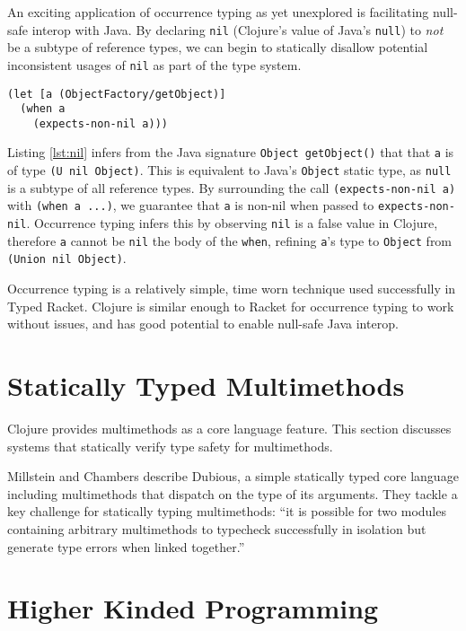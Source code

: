 An exciting application of occurrence typing as yet unexplored is facilitating null-safe interop with Java.
By declaring \lstinline|nil| (Clojure's value of Java's \lstinline|null|) to \emph{not} be a subtype of reference types,
we can begin to statically disallow potential inconsistent usages of \lstinline|nil| as part of the type system.

\begin{lstlisting}[caption=Observing nil-checks using occurrence typing, label=lst:nil]
(let [a (ObjectFactory/getObject)]
  (when a
    (expects-non-nil a)))
\end{lstlisting}

Listing \ref{lst:nil} infers from the Java signature \lstinline|Object getObject()| that
that \lstinline|a| is of type \lstinline|(U nil Object)|. This is equivalent to Java's
\lstinline|Object| static type, as \lstinline|null| is a subtype of all reference types. By surrounding
the call \lstinline|(expects-non-nil a)| with \lstinline|(when a ...)|, we guarantee that
\lstinline|a| is non-nil when passed to \lstinline|expects-non-nil|. Occurrence typing infers
this by observing \lstinline|nil| is a false value in Clojure, therefore \lstinline|a| cannot
be \lstinline|nil| the body of the \lstinline|when|, refining \lstinline|a|'s type to \lstinline|Object|
from \lstinline|(Union nil Object)|.

Occurrence typing is a relatively simple, time worn technique used successfully 
in Typed Racket. Clojure is similar enough to Racket for occurrence typing to work
without issues, and has good potential to enable null-safe Java interop.

\section{Statically Typed Multimethods}

Clojure provides multimethods as a core language feature. This section discusses systems that statically
verify type safety for multimethods.

Millstein and Chambers\cite{MS02}
describe Dubious, a simple statically typed core language including multimethods that
dispatch on the type of its arguments. They tackle a key challenge for statically typing
multimethods: ``it is possible for two modules containing arbitrary multimethods to typecheck
successfully in isolation but generate type errors when linked together.''\cite{MS02}

\section{Higher Kinded Programming}

